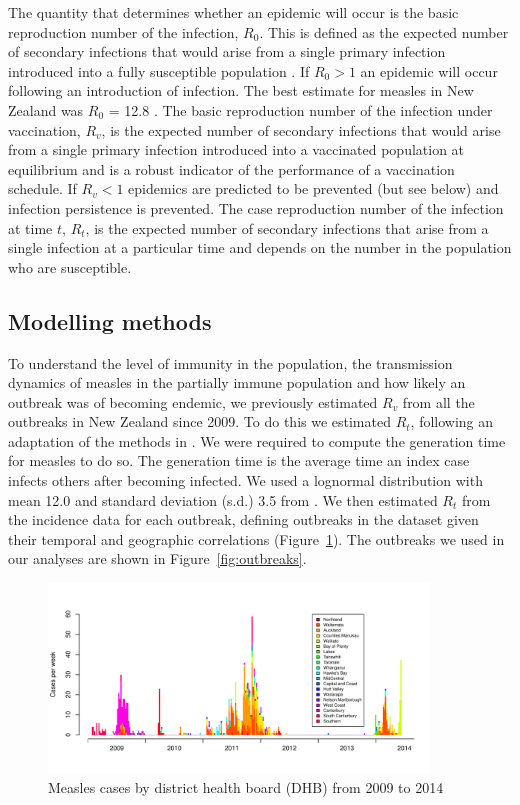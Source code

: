 \documentclass{article}
\begin{document}
The quantity that determines whether an epidemic will occur is the basic reproduction number of the infection, $R_0$. This is defined as the expected number of secondary infections that would arise from a single primary infection introduced into a fully susceptible population \citep{anderson91, diekmann0}. If $R_0 > 1$ an epidemic will occur following an introduction of infection. The best estimate for measles in New Zealand was $R_0$ = 12.8 \citep{roberts4}. The basic reproduction number of the infection under vaccination, $R_v$, is the expected number of secondary infections that would arise from a single primary infection introduced into a vaccinated population at equilibrium and is a robust indicator of the performance of a vaccination schedule. If $R_v < 1$ epidemics are predicted to be prevented (but see below) and infection persistence is prevented. The case reproduction number of the infection at time $t$, $R_t$, is the expected number of secondary infections that arise from a single infection at a particular time and depends on the number in the population who are susceptible.

\subsection{Modelling methods}

To understand the level of immunity in the population, the transmission dynamics of measles in the partially immune population and how likely an outbreak was of becoming endemic, we previously estimated $R_v$ from all the outbreaks in New Zealand since 2009. To do this we estimated $R_t$, following an adaptation of the methods in \citep{obidia12,wallinga4}. We were required to compute the generation time for measles to do so. The generation time is the average time an index case infects others after becoming infected. We used a lognormal distribution with mean 12.0 and standard deviation (s.d.) 3.5 from \citep{klinkenberg11}. We then estimated $R_t$ from the incidence data for each outbreak, defining outbreaks in the dataset given their temporal and geographic correlations (Figure~\ref{fig:dhbcases}). The outbreaks we used in our analyses are shown in Figure~\ref{fig:outbreaks}.

\begin{figure}
     \centering
     \includegraphics[width=0.9\textwidth]{cases_by_dhb_2009_2014.pdf}
     \caption{Measles cases by district health board (DHB) from 2009 to 2014}
     \label{fig:dhbcases}
\end{figure}
\end{document}
